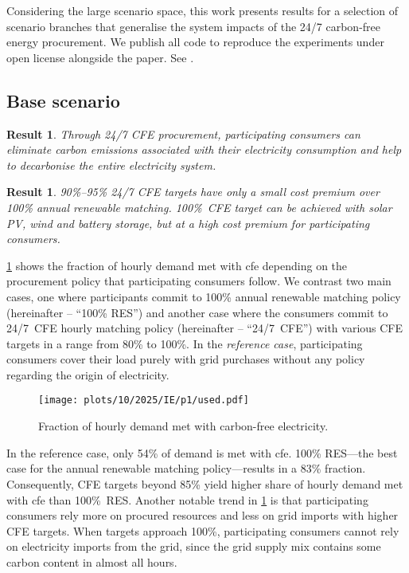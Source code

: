 \documentclass[11pt, 5p, nopreprintline]{elsarticle}
\newtheorem{res}[thm]{Result}  %
\begin{document}
Considering the large scenario space, this work presents results for a selection of scenario branches that generalise the system impacts of the 24/7 carbon-free energy procurement.
We publish all code to reproduce the experiments under open license alongside the paper.
See .

\subsection{Base scenario}
\label{subsec:base}

\begin{res}
    Through 24/7 CFE procurement, participating consumers can eliminate carbon emissions associated with their electricity consumption and help to decarbonise the entire electricity system.
\end{res}

\begin{res}
    90\%--95\% 24/7 CFE targets have only a small cost premium over 100\% annual renewable matching. 100\%~CFE target can be achieved with solar PV, wind and battery storage, but at a high cost premium for participating consumers.
\end{res}

\cref{fig:10-2025-IE-p1-used} shows the fraction of hourly demand met with \gls{cfe} depending on the procurement policy that participating consumers follow.
We contrast two main cases, one where participants commit to 100\% annual renewable matching policy (hereinafter -- \enquote{100\% RES}) and another case where the consumers commit to 24/7~CFE hourly matching policy (hereinafter -- \enquote{24/7~CFE}) with various CFE targets in a range from 80\% to 100\%.
In the \textit{reference case}, participating consumers cover their load purely with grid purchases without any policy regarding the origin of electricity.

\begin{figure}
    \centering
    \texttt{[image: plots/10/2025/IE/p1/used.pdf]}
    \caption{Fraction of hourly demand met with carbon-free electricity.}
    \label{fig:10-2025-IE-p1-used}
\end{figure}

In the reference case, only 54\% of demand is met with \gls{cfe}.
100\% RES---the best case for the annual renewable matching policy---results in a 83\% fraction.
Consequently, CFE targets beyond 85\% yield higher share of hourly demand met with \gls{cfe} than 100\%~RES.
Another notable trend in \cref{fig:10-2025-IE-p1-used} is that participating consumers rely more on procured resources and less on grid imports with higher CFE targets.
When targets approach 100\%, participating consumers cannot rely on electricity imports from the grid, since the grid supply mix contains some carbon content in almost all hours.
\end{document}
